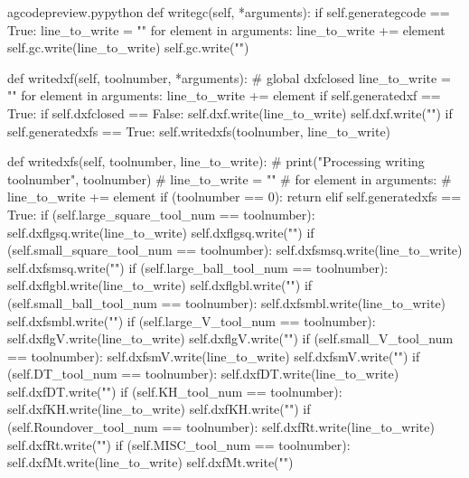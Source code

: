\documentclass{ltxdoc}
\begin{document}
\lstset{firstnumber=\thegcpy}
\begin{writecode}{a}{gcodepreview.py}{python}
    def writegc(self, *arguments):
        if self.generategcode == True:
            line_to_write = ""
            for element in arguments:
                line_to_write += element
            self.gc.write(line_to_write)
            self.gc.write("\n")

    def writedxf(self, toolnumber, *arguments):
#        global dxfclosed
        line_to_write = ""
        for element in arguments:
            line_to_write += element
        if self.generatedxf == True:
            if self.dxfclosed == False:
                self.dxf.write(line_to_write)
                self.dxf.write("\n")
        if self.generatedxfs == True:
            self.writedxfs(toolnumber, line_to_write)

    def writedxfs(self, toolnumber, line_to_write):
#        print("Processing writing toolnumber", toolnumber)
#        line_to_write = ""
#        for element in arguments:
#            line_to_write += element
        if (toolnumber == 0):
            return
        elif self.generatedxfs == True:
            if (self.large_square_tool_num == toolnumber):
                self.dxflgsq.write(line_to_write)
                self.dxflgsq.write("\n")
            if (self.small_square_tool_num == toolnumber):
                self.dxfsmsq.write(line_to_write)
                self.dxfsmsq.write("\n")
            if (self.large_ball_tool_num == toolnumber):
                self.dxflgbl.write(line_to_write)
                self.dxflgbl.write("\n")
            if (self.small_ball_tool_num == toolnumber):
                self.dxfsmbl.write(line_to_write)
                self.dxfsmbl.write("\n")
            if (self.large_V_tool_num == toolnumber):
                self.dxflgV.write(line_to_write)
                self.dxflgV.write("\n")
            if (self.small_V_tool_num == toolnumber):
                self.dxfsmV.write(line_to_write)
                self.dxfsmV.write("\n")
            if (self.DT_tool_num == toolnumber):
                self.dxfDT.write(line_to_write)
                self.dxfDT.write("\n")
            if (self.KH_tool_num == toolnumber):
                self.dxfKH.write(line_to_write)
                self.dxfKH.write("\n")
            if (self.Roundover_tool_num == toolnumber):
                self.dxfRt.write(line_to_write)
                self.dxfRt.write("\n")
            if (self.MISC_tool_num == toolnumber):
                self.dxfMt.write(line_to_write)
                self.dxfMt.write("\n")

\end{writecode}
\addtocounter{gcpy}{59}
\end{document}
